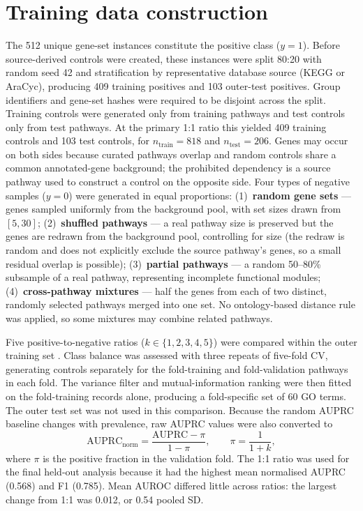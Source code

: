 \documentclass[12pt,letterpaper,oneside,openany]{book}
\begin{document}
\section{Training data construction}
\label{sec:dataset}

The 512 unique gene-set instances constitute the positive class ($y = 1$). Before source-derived controls were created, these instances were split 80:20 with random seed 42 and stratification by representative database source (KEGG or AraCyc), producing 409 training positives and 103 outer-test positives. Group identifiers and gene-set hashes were required to be disjoint across the split. Training controls were generated only from training pathways and test controls only from test pathways. At the primary 1:1 ratio this yielded 409 training controls and 103 test controls, for $n_{\mathrm{train}}=818$ and $n_{\mathrm{test}}=206$. Genes may occur on both sides because curated pathways overlap and random controls share a common annotated-gene background; the prohibited dependency is a source pathway used to construct a control on the opposite side.
Four types of negative samples ($y = 0$) were generated in equal proportions:
(1)~\textbf{random gene sets} --- genes sampled uniformly from the background pool, with set sizes drawn from $[5,30]$;
(2)~\textbf{shuffled pathways} --- a real pathway size is preserved but the genes are redrawn from the background pool, controlling for size (the redraw is random and does not explicitly exclude the source pathway's genes, so a small residual overlap is possible);
(3)~\textbf{partial pathways} --- a random 50--80\% subsample of a real pathway, representing incomplete functional modules;
(4)~\textbf{cross-pathway mixtures} --- half the genes from each of two distinct, randomly selected pathways merged into one set. No ontology-based distance rule was applied, so some mixtures may combine related pathways.

Five positive-to-negative ratios ($k \in \{1,2,3,4,5\}$) were compared within the outer training set \citep{japkowicz2002class}. Class balance was assessed with three repeats of five-fold CV, generating controls separately for the fold-training and fold-validation pathways in each fold. The variance filter and mutual-information ranking were then fitted on the fold-training records alone, producing a fold-specific set of 60 GO terms. The outer test set was not used in this comparison. Because the random AUPRC baseline changes with prevalence, raw AUPRC values were also converted to
\begin{equation}
\mathrm{AUPRC}_{\mathrm{norm}} =
\frac{\mathrm{AUPRC}-\pi}{1-\pi}, \qquad \pi=\frac{1}{1+k},
\label{eq:normalized_auprc}
\end{equation}
where $\pi$ is the positive fraction in the validation fold. The 1:1 ratio was used for the final held-out analysis because it had the highest mean normalised AUPRC (0.568) and F1 (0.785). Mean AUROC differed little across ratios: the largest change from 1:1 was 0.012, or 0.54 pooled SD.
\end{document}
